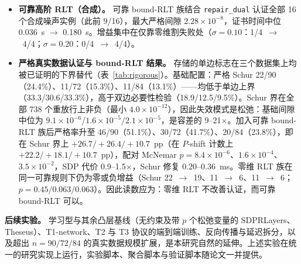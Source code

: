 \begin{itemize}
\item \textbf{可靠高阶 RLT（合成）。} 可靠 bound-RLT 族结合 \texttt{repair\_dual} 认证全部 16 个合成噪声实例（此前 9/16），最大严格间隙 $2.28\times10^{-8}$，证书时间中位 0.036~s $\to$ 0.180~s。增益集中在仅靠零维割失败处（$\sigma=0.10$：1/4~$\to$~4/4；$\sigma=0.20$：0/4~$\to$~4/4）。
\item \textbf{严格真实数据认证与 bound-RLT 结果。} 存储的单边标志在三个数据集上均被已证明的下界替代（表~\ref{tab:rigorous}）。基础配置：严格 Schur 22/90（24.4\%）、11/72（15.3\%）、11/84（13.1\%）——均低于单边上界（33.3/30.6/33.3\%），高于双边必要性检验（18.9/12.5/9.5\%）。Schur 界在全部 738 个重放行上非负（最小 $4.0\times10^{-12}$），因此失效模式是松弛：基础间隙中位为 $9.1\times10^{-6}$/$1.6\times10^{-5}$/$2.1\times10^{-5}$，是容差的 9--21$\times$。加入可靠 bound-RLT 族后严格率升至 46/90（51.1\%）、30/72（41.7\%）、20/84（23.8\%），即在 Schur 界上 $+26.7/+26.4/+10.7$~pp（在 $P$-shift 计数上 $+22.2/+18.1/+10.7$~pp），配对 McNemar $p=8.4\times10^{-6}$、$1.6\times10^{-4}$、$3.5\times10^{-2}$，SDP 代价 0.9--1.5$\times$，Schur 修复 0.20--0.36~ms。零维 RLT 族在同一可靠规则下仍为零或负增益（Schur 22~$\to$~19、11~$\to$~6、11~$\to$~6；$p=0.45/0.063/0.063$）。因此读数应为：零维 RLT 不改善认证，而可靠 bound-RLT 可以。
\end{itemize}

\textbf{后续实验。} 学习型与其余凸层基线（无约束及带 $p$ 个松弛变量的 SDPRLayers、Theseus）、T1-network、T2 与 T3 协议的端到端训练、反向传播与延迟拆分，以及超出 $n=90/72/84$ 的真实数据规模扩展，是本研究自然的延伸。上述实验在统一的研究实现上运行，实验脚本、聚合脚本与验证脚本随论文一并提供。

